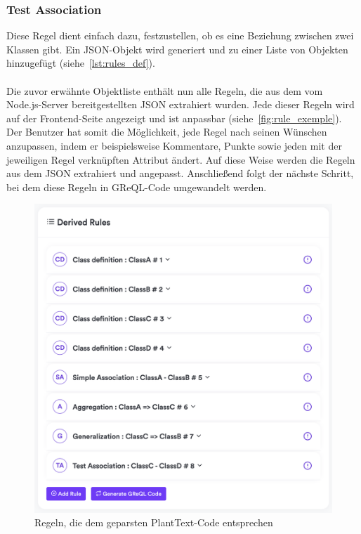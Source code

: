 \subsubsection{Test Association}
Diese Regel dient einfach dazu, festzustellen, ob es eine Beziehung zwischen zwei Klassen gibt. Ein JSON-Objekt wird
generiert und zu einer Liste von Objekten hinzugefügt (siehe~\ref{lst:rules_def}).
\\~\\
Die zuvor erwähnte Objektliste enthält nun alle Regeln, die aus dem vom Node.js-Server bereitgestellten JSON extrahiert
wurden. Jede dieser Regeln wird auf der Frontend-Seite angezeigt und ist anpassbar (siehe~\ref{fig:rule_exemple}).
Der Benutzer hat somit die Möglichkeit, jede Regel nach seinen Wünschen anzupassen, indem er beispielsweise Kommentare,
Punkte sowie jeden mit der jeweiligen Regel verknüpften Attribut ändert. Auf diese Weise werden die Regeln aus dem JSON
extrahiert und angepasst. Anschließend folgt der nächste Schritt, bei dem diese Regeln in GReQL-Code umgewandelt werden.

\begin{figure}[!h]
    \centering
    \includegraphics[width=16cm]{images/extracted_rules}
    \caption{Regeln, die dem geparsten PlantText-Code entsprechen}
    \label{fig:extracted_rules}
\end{figure}

